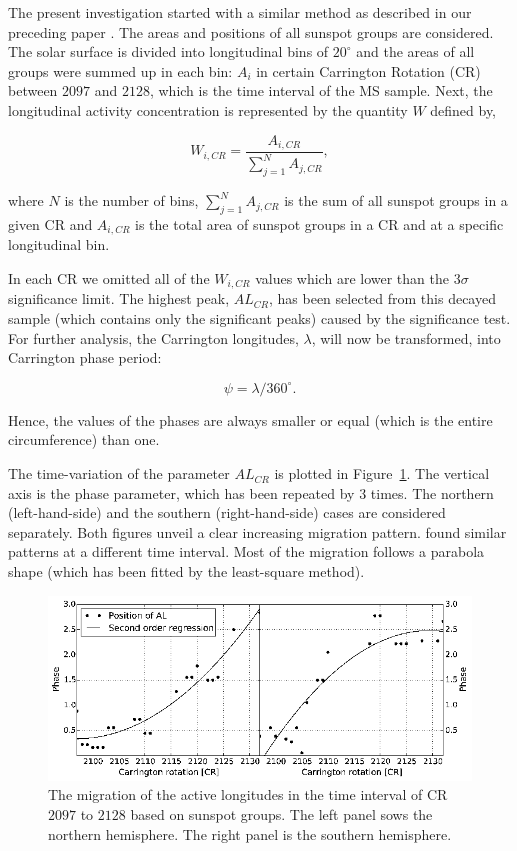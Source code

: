 The present investigation started with a similar method as described in our preceding paper \citep{Gyenge2012}. The areas and positions of all sunspot groups are considered. The solar surface is divided into longitudinal bins of $20^{\circ}$ and the areas of all groups were summed up in each bin: $ A_{i}$ in certain Carrington Rotation (CR) between $2097$ and $2128$, which is the time interval of the MS sample. Next, the longitudinal activity concentration is represented by the quantity $W$ defined by,

\begin{equation}
W_{i,CR} = \frac{A_{i,CR}}{ \sum_{j=1}^{N} A_{j,CR} },
\end{equation}

where $N$ is the number of bins, $\sum_{j=1}^{N} A_{j,CR}$  is the sum of all sunspot groups in a given CR and $A_{i,CR}$ is the  total area of sunspot groups in a CR and at a specific longitudinal bin.

In each CR we omitted all of the $ W_{i,CR}$ values which are lower than the $3\sigma$ significance limit. The highest peak, $AL_{CR}$, has been selected from this decayed sample (which contains only the significant peaks) caused by the significance test. For further analysis, the Carrington longitudes, $\lambda$, will now be transformed, into Carrington phase period: 

\begin{equation}
\psi = \lambda/360^{\circ}.
\end{equation}

Hence, the values of the phases are always smaller or equal (which is the entire circumference) than one. 

The time-variation of the parameter $AL_{CR}$ is plotted in Figure~\ref{AL}. The vertical axis is the phase parameter, which has been repeated by $3$ times.
The northern (left-hand-side) and the southern (right-hand-side) cases are considered separately. Both figures unveil a clear increasing migration pattern. \cite{Usoskin2005,Gyenge2014} found similar patterns at a different time interval. Most of the migration follows a parabola shape (which has been fitted by the least-square method).

\begin{figure}
	\centering
	\includegraphics[width=128mm]{Chapter4/Figs/AL}
	\caption{The migration of the active longitudes in the time interval of CR $2097$ to $2128$ based on sunspot groups. The left panel sows the northern hemisphere. The right panel is the southern hemisphere.}
	\label{AL}
\end{figure}

